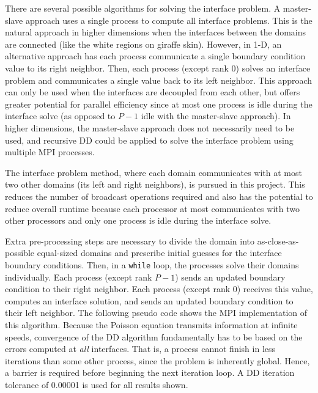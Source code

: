 \documentclass[10pt]{article}
\begin{document}
\begin{enumerate}
There are several possible algorithms for solving the interface problem. A master-slave approach uses a single process to compute all interface problems. This is the natural approach in higher dimensions when the interfaces between the domains are connected (like the white regions on giraffe skin). However, in 1-D, an alternative approach has each process communicate a single boundary condition value to its right neighbor. Then, each process (except rank 0) solves an interface problem and communicates a single value back to its left neighbor. This approach can only be used when the interfaces are decoupled from each other, but offers greater potential for parallel efficiency since at most one process is idle during the interface solve (as opposed to \(P-1\) idle with the master-slave approach). In higher dimensions, the master-slave approach does not necessarily need to be used, and recursive DD could be applied to solve the interface problem using multiple MPI processes.
\end{enumerate}

The interface problem method, where each domain communicates with at most two other domains (its left and right neighbors), is pursued in this project. This reduces the number of broadcast operations required and also has the potential to reduce overall runtime because each processor at most communicates with two other processors and only one process is idle during the interface solve. 

Extra pre-processing steps are necessary to divide the domain into as-close-as-possible equal-sized domains and prescribe initial guesses for the interface boundary conditions. Then, in a {\tt while} loop, the processes solve their domains individually. Each process (except rank \(P-1\)) sends an updated boundary condition to their right neighbor. Each process (except rank 0) receives this value, computes an interface solution, and sends an updated boundary condition to their left neighbor. The following pseudo code shows the MPI implementation of this algorithm. Because the Poisson equation transmits information at infinite speeds, convergence of the DD algorithm fundamentally has to be based on the errors computed at {\it all} interfaces. That is, a process cannot finish in less iterations than some other process, since the problem is inherently global. Hence, a barrier is required before beginning the next iteration loop. A DD iteration tolerance of 0.00001 is used for all results shown.
\end{document}
